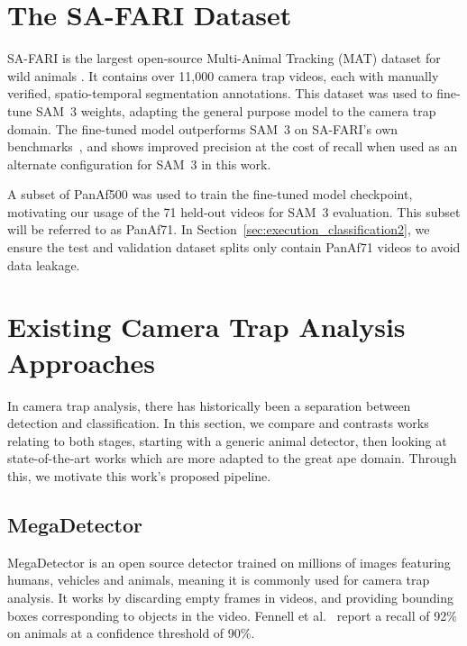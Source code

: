 \documentclass[author={Jacob Stephenson},
    degree={BSc},
    title={Robust Great Ape Species Detection in Wild Camera Trap Imagery with Promptable Concept Segmentation},
    unit={COMS30045},
    subtitle={}]{dissertation}
\begin{document}

\section{The SA-FARI Dataset}

SA-FARI is the largest open-source Multi-Animal Tracking (MAT) dataset for wild animals \cite{wasmuht2025safaridatasetsegmentfootage}. It contains over 11,000 camera trap videos, each with manually verified, spatio-temporal segmentation annotations. This dataset was used to fine-tune SAM~3 weights, adapting the general purpose model to the camera trap domain. The fine-tuned model outperforms SAM~3 on SA-FARI's own benchmarks~\cite{wasmuht2025safaridatasetsegmentfootage}, and shows improved precision at the cost of recall when used as an alternate configuration for SAM~3 in this work.

A subset of PanAf500 was used to train the fine-tuned model checkpoint, motivating our usage of the 71 held-out videos for SAM~3 evaluation. This subset will be referred to as PanAf71. In Section~\ref{sec:execution_classification2}, we ensure the test and validation dataset splits only contain PanAf71 videos to avoid data leakage.


\section{Existing Camera Trap Analysis Approaches}
\label{sec:bg_existing}

In camera trap analysis, there has historically been a separation between detection and classification. In this section, we compare and contrasts works relating to both stages, starting with a generic animal detector, then looking at state-of-the-art works which are more adapted to the great ape domain. Through this, we motivate this work's proposed pipeline.

\subsection{MegaDetector}

MegaDetector is an open source detector trained on millions of images featuring humans, vehicles and animals, meaning it is commonly used for camera trap analysis. It works by discarding empty frames in videos, and providing bounding boxes corresponding to objects in the video. Fennell et al.~\cite{Fennell2022.01.14.476404} report a recall of 92\% on animals at a confidence threshold of 90\%.
\end{document}
